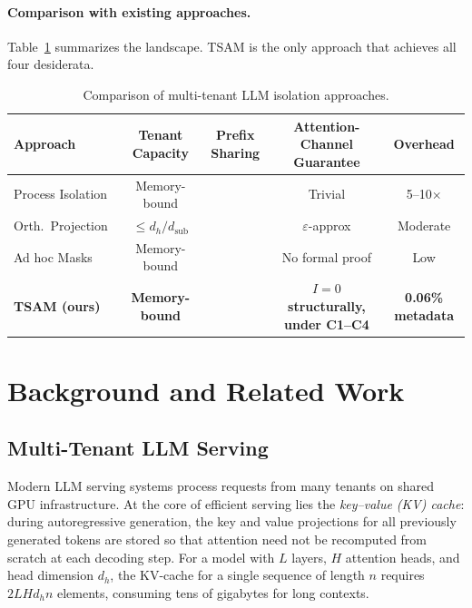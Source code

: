 \documentclass[11pt]{article}
\newcommand{\cmark}{\ding{51}}
\newcommand{\xmark}{\ding{55}}
\begin{document}
\paragraph{Comparison with existing approaches.}
Table~\ref{tab:comparison} summarizes the landscape.  TSAM is the only
approach that achieves all four desiderata.

\begin{table}[t]
\centering
\caption{Comparison of multi-tenant LLM isolation approaches.}
\label{tab:comparison}
\vspace{4pt}
\small
\begin{tabular}{@{}lcccc@{}}
\toprule
\textbf{Approach} & \textbf{Tenant Capacity} & \textbf{Prefix Sharing} & \textbf{Attention-Channel Guarantee} & \textbf{Overhead} \\
\midrule
Process Isolation          & Memory-bound & \xmark & Trivial         & 5--10$\times$ \\
Orth.\ Projection~\citep{li2024orthogonal} & $\leq d_h / d_{\mathrm{sub}}$ & \xmark & $\varepsilon$-approx & Moderate \\
Ad hoc Masks~\citep{gao2024attentionguard}  & Memory-bound & \cmark & No formal proof  & Low \\
\textbf{TSAM (ours)}      & \textbf{Memory-bound} & \cmark & \textbf{$I{=}0$ structurally, under C1--C4} & \textbf{0.06\% metadata} \\
\bottomrule
\end{tabular}
\end{table}

\section{Background and Related Work}
\label{sec:background}

\subsection{Multi-Tenant LLM Serving}
\label{sec:bg_serving}

Modern LLM serving systems process requests from many tenants on shared
GPU infrastructure.  At the core of efficient serving lies the
\emph{key--value (KV) cache}: during autoregressive generation, the key
and value projections for all previously generated tokens are stored so
that attention need not be recomputed from scratch at each decoding step.
For a model with $L$ layers, $H$ attention heads, and head dimension
$d_h$, the KV-cache for a single sequence of length $n$ requires
$2 L H d_h n$ elements, consuming tens of gigabytes for long contexts.
\end{document}
